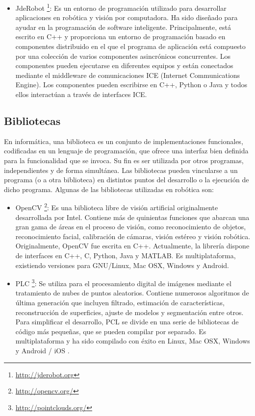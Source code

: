 \begin{itemize}
	\item JdeRobot \footnote{\url{http://jderobot.org}}: Es un entorno de programación utilizado para desarrollar aplicaciones en robótica y visión por computadora. Ha sido diseñado para ayudar en la programación de software inteligente. Principalmente, está escrito en C++ y proporciona un entorno de programación basado en componentes distribuido en el que el programa de aplicación está compuesto por una colección de varios componentes asincrónicos concurrentes. Los componentes pueden ejecutarse en diferentes equipos y están conectados mediante el middleware de comunicaciones ICE (Internet Communications Engine). Los componentes pueden escribirse en C++, Python o Java y todos ellos interactúan a través de interfaces ICE.

\end{itemize}

\subsection{Bibliotecas}
En informática, una biblioteca es un conjunto de implementaciones funcionales, codificadas en un lenguaje de programación, que ofrece una interfaz bien definida para la funcionalidad que se invoca. Su fin es ser utilizada por otros programas, independientes y de forma simultánea. Las bibliotecas pueden vincularse a un programa (o a otra biblioteca) en distintos puntos del desarrollo o la ejecución de dicho programa. Algunas de las bibliotecas utilizadas en robótica son:

\begin{itemize}
	\item OpenCV \footnote{\url{http://opencv.org/}}: Es una biblioteca libre de visión artificial originalmente desarrollada por Intel. Contiene más de quinientas funciones que abarcan una gran gama de áreas en el proceso de visión, como reconocimiento de objetos, reconocimiento facial, calibración de cámaras, visión estéreo y visión robótica. Originalmente, OpenCV fue escrita en C++. Actualmente, la librería dispone de interfaces en C++, C, Python, Java y MATLAB. Es multiplataforma, existiendo versiones para GNU/Linux, Mac OSX, Windows y Android.
	
	\item PLC \footnote{\url{http://pointclouds.org/}}: Se utiliza para el procesamiento digital de imágenes mediante el tratamiento de nubes de puntos aleatorios. Contiene numerosos algoritmos de última generación que incluyen filtrado, estimación de características, reconstrucción de superficies, ajuste de modelos y segmentación entre otros. Para simplificar el desarrollo, PCL se divide en una serie de bibliotecas de código más pequeñas, que se pueden compilar por separado. Es multiplataforma y ha sido compilado con éxito en Linux, Mac OSX, Windows y Android / iOS . 
\end{itemize}

